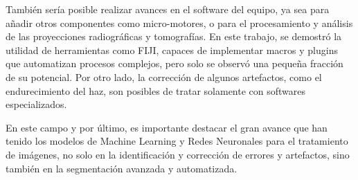 También sería posible realizar avances en el software del equipo, ya sea para añadir otros componentes
como micro-motores, o para el procesamiento y análisis de las proyecciones radiográficas y tomografías.
En este trabajo, se demostró la utilidad de herramientas como FIJI, capaces de implementar macros y
plugins que automatizan procesos complejos, pero solo se observó una pequeña fracción de su potencial.
Por otro lado, la corrección de algunos artefactos, como el endurecimiento del haz, son posibles de tratar
solamente con softwares especializados.

En este campo y por último, es importante destacar el gran avance
que han tenido los modelos de Machine Learning y Redes Neuronales para el tratamiento de imágenes,
no solo en la identificación y corrección de errores y artefactos, sino también en la
segmentación avanzada y automatizada. 
